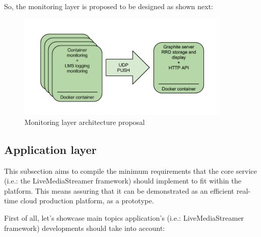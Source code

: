 So, the monitoring layer is proposed to be designed as shown next:

\begin{figure}[htb]
\begin{center}
\includegraphics[width=0.9\textwidth]{./images/mlap.png}
\caption{Monitoring layer architecture proposal}
\label{F:MLAP}
\end{center}
\end{figure}

\subsection{Application layer}\label{B:appLayerCH2}

This subsection aims to compile the minimum requirements that the core service (i.e.: the LiveMediaStreamer framework) should implement to fit within the platform. This means assuring that it can be demonstrated as an efficient real-time cloud production platform, as a prototype.

First of all, let's showcase main topics application's (i.e.: LiveMediaStreamer framework) developments should take into account:

